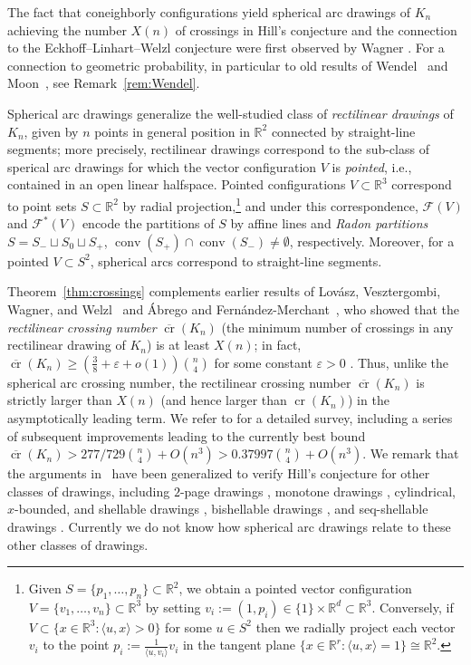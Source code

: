\documentclass[a4paper,USenglish,cleveref, autoref, thm-restate,nolineno]{socg-lipics-v2021}
\DeclareMathOperator{\conv}{conv}
\DeclareMathOperator{\cross}{cr}
\renewcommand{\geq}{\geqslant}
\newcommand{\R}{\mathbb{R}}
\begin{document}
The fact that coneighborly configurations yield spherical arc drawings of $K_n$ achieving the number $X(n)$ of crossings in Hill's conjecture and the connection to the Eckhoff--Linhart--Welzl conjecture were first observed by Wagner \cite{Wagner:2006aa,Wagner:2008aa}. For a connection to geometric probability, in particular to old results of Wendel~\cite{Wendel:1962aa}  and Moon~\cite{Moon:1965aa}, see Remark~\ref{rem:Wendel}.

Spherical arc drawings generalize the well-studied class of \emph{rectilinear drawings} of $K_n$, given by $n$ points in general position in $\R^2$ connected by straight-line segments; more precisely, rectilinear drawings correspond to the sub-class of sperical arc drawings for which the vector configuration $V$ is \emph{pointed}, i.e., contained in an open linear halfspace. Pointed configurations $V\subset \R^3$ correspond to point sets $S\subset \R^2$ by radial projection,\footnote{Given $S=\{p_1,\dots,p_n\} \subset \R^2$, we obtain a pointed vector configuration $V=\{v_1,\dots,v_n\} \subset \R^3$ by setting $v_i:=(1,p_i)\in \{1\}\times \R^d \subset \R^3$. Conversely, if $V \subset \{x \in \R^3\colon \langle u,x\rangle>0\}$ for some $u\in S^2$ then we radially project each vector $v_i$ to the point $p_i:=\frac{1}{\langle u, v_i\rangle} v_i$ in the tangent plane $\{x\in \R^r\colon \langle u,x\rangle = 1\} \cong \R^2$.}
and under this correspondence, $\mathcal{F}(V)$ and $\mathcal{F}^*(V)$ encode the partitions of $S$ by affine lines and \emph{Radon partitions} $S=S_-\sqcup S_0 \sqcup S_+$, $\conv(S_+) \cap \conv(S_-)\neq \emptyset$, respectively. Moreover, for a pointed $V \subset S^2$, spherical arcs correspond to straight-line segments.  

Theorem~\ref{thm:crossings} complements earlier results of Lov\'asz, Vesztergombi, Wagner, and Welzl~\cite{Lovasz:2004aa} and \'Abrego and Fern\'andez-Merchant~\cite{Abrego:2005aa}, who showed that the \emph{rectilinear crossing number} $\overline{\cross}(K_n)$ (the minimum number of crossings in any rectilinear drawing of $K_n$) is at least $X(n)$; in fact, $\overline{\cross}(K_n)\geq (\frac{3}{8}+\varepsilon+o(1))\binom{n}{4}$ for some constant $\varepsilon>0$ \cite{Lovasz:2004aa}. Thus, unlike the spherical arc crossing number, the rectilinear crossing number $\overline{\cross}(K_n)$ is strictly larger than $X(n)$ (and hence larger than $\cross(K_n)$) in the asymptotically leading term. We refer to  \cite{Abrego:2013ab} for a detailed survey, including a series of subsequent improvements \cite{Balogh:2006aa,Aichholzer:2007aa,Abrego:2008aa,Abrego:2008ab} leading to the currently best bound \cite{Abrego:2012aa} $\overline{\cross}(K_n) > 277/729 \binom{n}{4}+O(n^3) > 0.37997 \binom{n}{4}+O(n^3)$. We remark that the arguments in~\cite{Lovasz:2004aa,Abrego:2005aa} have been generalized to verify Hill's conjecture for other classes of drawings, including $2$-page drawings \cite{Abrego:2013aa}, monotone drawings \cite{Balko:2015aa}, cylindrical, $x$-bounded, and shellable drawings  \cite{Abrego:2014aa}, bishellable drawings \cite{Abrego:2018aa}, and seq-shellable drawings \cite{Mutzel:2018aa}. Currently we do not know %
how spherical arc drawings relate to these other classes of drawings.
\end{document}
